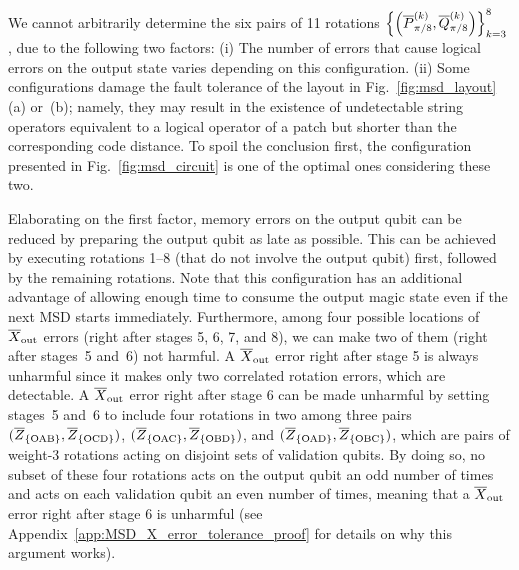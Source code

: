 \documentclass[
 prx,
 reprint,
 superscriptaddress,
 longbibliography,
 dvipsnames
]{revtex4-2}
\begin{document}

We cannot arbitrarily determine the six pairs of 11 rotations $\qty{\qty(\overline{P}^{(k)}_{\pi/8}, \overline{Q}^{(k)}_{\pi/8})}_{k=3}^8$, due to the following two factors:
(i) The number of errors that cause logical errors on the output state varies depending on this configuration.
(ii) Some configurations damage the fault tolerance of the layout in Fig.~\ref{fig:msd_layout}(a) or~(b); namely, they may result in the existence of undetectable string operators equivalent to a logical operator of a patch but shorter than the corresponding code distance.
To spoil the conclusion first, the configuration presented in Fig.~\ref{fig:msd_circuit} is one of the optimal ones considering these two.

Elaborating on the first factor, memory errors on the output qubit can be reduced by preparing the output qubit as late as possible.
This can be achieved by executing rotations 1--8 (that do not involve the output qubit) first, followed by the remaining rotations.
Note that this configuration has an additional advantage of allowing enough time to consume the output magic state even if the next MSD starts immediately.
Furthermore, among four possible locations of $\overline{X}_{\mathrm{out}}$ errors (right after stages 5, 6, 7, and 8), we can make two of them (right after stages~5 and~6) not harmful.
A $\overline{X}_{\mathrm{out}}$ error right after stage 5 is always unharmful since it makes only two correlated rotation errors, which are detectable.
A $\overline{X}_{\mathrm{out}}$ error right after stage 6 can be made unharmful by setting stages~5 and~6 to include four rotations in two among three pairs $(\overline{Z}_\qty{\text{OAB}}, \overline{Z}_\qty{\text{OCD}})$, $(\overline{Z}_\qty{\text{OAC}}, \overline{Z}_\qty{\text{OBD}})$, and $(\overline{Z}_\qty{\text{OAD}}, \overline{Z}_\qty{\text{OBC}})$, which are pairs of weight-3 rotations acting on disjoint sets of validation qubits.
By doing so, no subset of these four rotations acts on the output qubit an odd number of times and acts on each validation qubit an even number of times, meaning that a $\overline{X}_{\mathrm{out}}$ error right after stage 6 is unharmful (see Appendix~\ref{app:MSD_X_error_tolerance_proof} for details on why this argument works).
\end{document}
